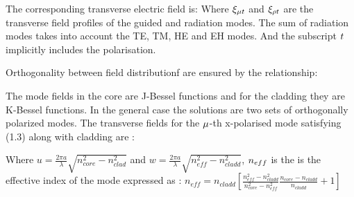 \documentclass[11pt, openright]{book}
\begin{document}
        The corresponding transverse electric field is: 
        Where $\displaystyle{\xi_{\mu t}}$ and $\displaystyle{\xi_{\rho t}}$ are the transverse field profiles of the guided and radiation modes.
        The sum of radiation modes takes into account the TE, TM, HE and EH modes. And the subscript $\displaystyle{t}$ implicitly includes the polarisation.

        Orthogonality between field distributionf are ensured by the relationship: 

        The mode fields in the core are J-Bessel functions and for the cladding they are K-Bessel functions. In the general case the solutions are two sets of orthogonally polarized modes. The transverse fields for the $\displaystyle{\mu}$-th x-polarised mode satisfying (1.3) along with cladding are : 

        Where ${u = \frac{2\pi a}{\lambda} \sqrt{n_{core}^2-n_{clad}^2}  }$ and ${w = \frac{2\pi a}{\lambda} \sqrt{n_{eff}^2 - n_{cladd}^2} }$, $\displaystyle{n_{eff}}$ is the is the effective index of the mode expressed as : ${n_{eff}= n_{cladd} \left[ \frac{n_{eff}^2-n_{cladd}^2}{n_{core}^2-n_{eff}^2} \frac{n_{core}-n_{cladd}}{n_{cladd}} +1 \right] }$ 
        
\end{document}
